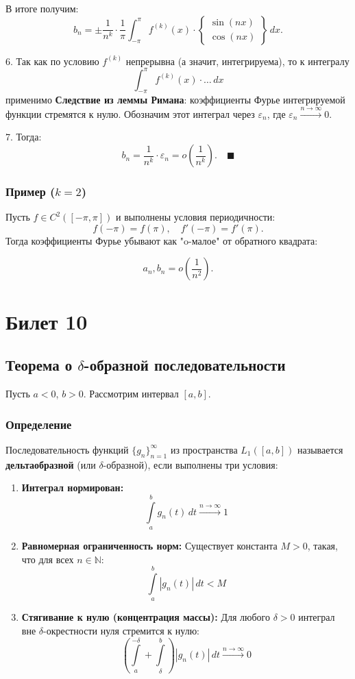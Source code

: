 \documentclass[12pt,a4paper,openany]{book}
\begin{document}
В итоге получим:
$$ b_n = \pm \frac{1}{n^k} \cdot \frac{1}{\pi} \int_{-\pi}^{\pi} f^{(k)}(x) \cdot \left\{ \begin{matrix} \sin(nx) \\ \cos(nx) \end{matrix} \right\} \, dx. $$

6. Так как по условию $f^{(k)}$ непрерывна (а значит, интегрируема), то к интегралу
$$ \int_{-\pi}^{\pi} f^{(k)}(x) \cdot \dots \, dx $$
применимо \textbf{Следствие из леммы Римана}: коэффициенты Фурье интегрируемой функции стремятся к нулю.
Обозначим этот интеграл через $\varepsilon_n$, где $\varepsilon_n \xrightarrow{n \to \infty} 0$.

7. Тогда:
$$ b_n = \frac{1}{n^k} \cdot \varepsilon_n = o\left(\frac{1}{n^k}\right). \quad \blacksquare $$

\subsection*{Пример ($k=2$)}
Пусть $f \in C^2([-\pi, \pi])$ и выполнены условия периодичности:
$$ f(-\pi) = f(\pi), \quad f'(-\pi) = f'(\pi). $$
Тогда коэффициенты Фурье убывают как "o-малое" от обратного квадрата:

$$ a_n, b_n = o\left(\frac{1}{n^2}\right). $$

\chapter{Билет 10}
\section{Теорема о $\delta$-образной последовательности}

Пусть $a < 0$, $b > 0$. Рассмотрим интервал $[a, b]$.

\subsection{Определение}
Последовательность функций $\{g_n\}_{n=1}^{\infty}$ из пространства $L_1([a, b])$ называется \textbf{дельтаобразной} (или $\delta$-образной), если выполнены три условия:

\begin{enumerate}
    \item \textbf{Интеграл нормирован:}
    \[
    \int\limits_{a}^{b} g_n(t)\,dt \xrightarrow{n \to \infty} 1
    \]
    
    \item \textbf{Равномерная ограниченность норм:}
    Существует константа $M > 0$, такая, что для всех $n \in \mathbb{N}$:
    \[
    \int\limits_{a}^{b} |g_n(t)|\,dt < M
    \]
    
    \item \textbf{Стягивание к нулю (концентрация массы):}
    Для любого $\delta > 0$ интеграл вне $\delta$-окрестности нуля стремится к нулю:
    \[
    \left( \int\limits_{a}^{-\delta} + \int\limits_{\delta}^{b} \right) |g_n(t)|\,dt \xrightarrow{n \to \infty} 0
    \]
\end{enumerate}
\end{document}
